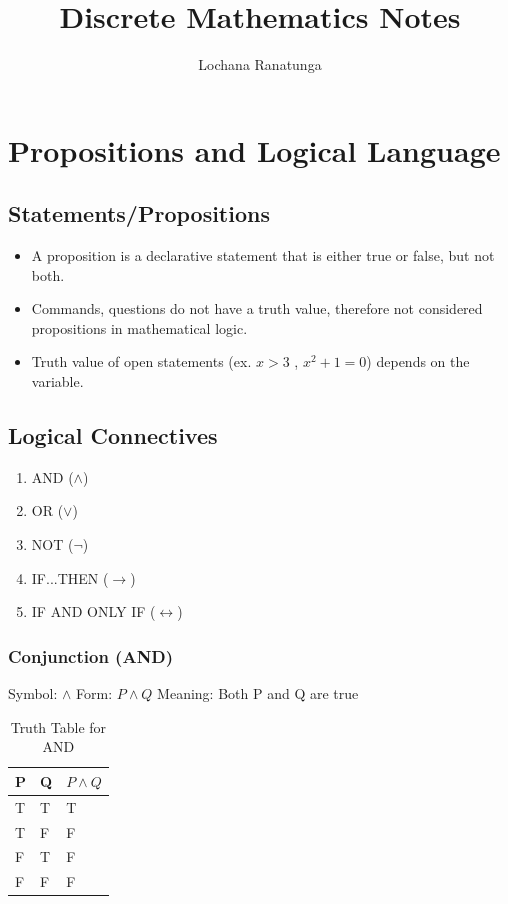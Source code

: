 \documentclass{article}
\begin{document}
\title{Discrete Mathematics Notes}
\author{Lochana Ranatunga}
\maketitle

\section{Propositions and Logical Language}
\subsection*{Statements/Propositions}

\begin{itemize}
  \item A proposition is a declarative statement that is either true or false, but not both.
  \item Commands, questions do not have a truth value, therefore not considered propositions in mathematical logic.
  \item Truth value of open statements (ex. $x > 3$ , $x^2 + 1 = 0$) depends on the variable.
\end{itemize}

\subsection*{Logical Connectives}
\begin{enumerate}
  \item AND ($\land$)
  \item OR ($\lor$)
  \item NOT ($\neg$)
  \item IF...THEN ($\rightarrow$)
  \item IF AND ONLY IF ($\leftrightarrow$)
\end{enumerate}

\subsubsection*{Conjunction (AND)}
Symbol: $\land$ \hspace{1.5cm}
Form: $P \land Q$ \hspace{1.5cm}
Meaning: Both P and Q are true \\
\begin{table}[h]
\centering
\renewcommand{\arraystretch}{1.01}
\begin{tabular}{|>{\centering\arraybackslash}p{2cm}|>{\centering\arraybackslash}p{2cm}|>{\centering\arraybackslash}p{2cm}|}
\hline
P & Q &  $P \land Q$\\
\hline
T & T & T \\
\hline
T & F & F \\
\hline
F & T & F \\
\hline
F & F & F \\
\hline
\end{tabular}
\caption{Truth Table for AND}
\end{table}
\end{document}
